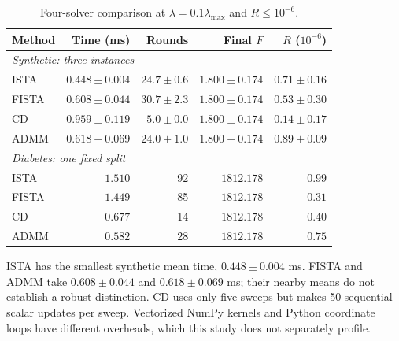 \documentclass[10pt,letterpaper]{article}
\begin{document}
\begin{table}[!htb]\centering\small
\caption{Four-solver comparison at $\lambda=0.1\lambda_{\max}$ and $R\leq10^{-6}$.}\label{tab:main}
\begin{tabular*}{\linewidth}{@{\extracolsep{\fill}}lrrrr@{}}\toprule
Method & Time (ms) & Rounds & Final $F$ & $R$ ($10^{-6}$)\\\midrule
\multicolumn{5}{l}{\textit{Synthetic: three instances}}\\
ISTA & $0.448 \pm 0.004$ & $24.7 \pm 0.6$ & $1.800 \pm 0.174$ & $0.71 \pm 0.16$\\
FISTA & $0.608 \pm 0.044$ & $30.7 \pm 2.3$ & $1.800 \pm 0.174$ & $0.53 \pm 0.30$\\
CD & $0.959 \pm 0.119$ & $5.0 \pm 0.0$ & $1.800 \pm 0.174$ & $0.14 \pm 0.17$\\
ADMM & $0.618 \pm 0.069$ & $24.0 \pm 1.0$ & $1.800 \pm 0.174$ & $0.89 \pm 0.09$\\
\midrule\multicolumn{5}{l}{\textit{Diabetes: one fixed split}}\\
ISTA & $1.510$ & 92 & $1812.178$ & $0.99$\\
FISTA & $1.449$ & 85 & $1812.178$ & $0.31$\\
CD & $0.677$ & 14 & $1812.178$ & $0.40$\\
ADMM & $0.582$ & 28 & $1812.178$ & $0.75$\\
\bottomrule\end{tabular*}
\par\vspace{2pt}{\footnotesize Synthetic entries: mean $\pm$ sample SD across three instances. Time per instance is the median of five runs. All solver-specific preparation is included; shared spectral setup is excluded.}
\end{table}

ISTA has the smallest synthetic mean time, $0.448 \pm 0.004$ ms. FISTA and ADMM take $0.608 \pm 0.044$ and $0.618 \pm 0.069$ ms; their nearby means do not establish a robust distinction. CD uses only five sweeps but makes 50 sequential scalar updates per sweep. Vectorized NumPy kernels and Python coordinate loops have different overheads, which this study does not separately profile.
\end{document}
